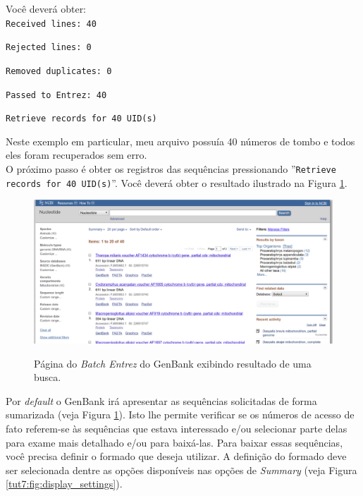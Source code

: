 \begin{refsection}
Você deverá obter:\\

\scriptsize
\noindent\texttt{Received lines: 40}

\noindent\texttt{Rejected lines: 0}

\noindent\texttt{Removed duplicates: 0}

\noindent\texttt{Passed to Entrez: 40}

\noindent\texttt{Retrieve records for 40 UID(s)}

\normalsize

Neste exemplo em particular, meu arquivo possuía 40 números de tombo e todos eles foram recuperados sem erro.\\
O próximo passo é obter os registros das sequências pressionando ''\texttt{Retrieve records for 40 UID(s)}''. Você deverá obter o resultado ilustrado na Figura \ref{tut7:fig:bacth_entrez_2}.\\

  \begin{figure}[H]
       \centering
      {\includegraphics[scale=0.3]{figures/tut7/entrez_2.eps}}
	{\caption[GenBnank \textit{Batch Entrez}: resultado de busca]{Página do \textit{Batch Entrez} do GenBank exibindo resultado de uma busca.}\label{tut7:fig:bacth_entrez_2}}
  \end{figure}


Por \textit{default} o GenBank irá apresentar as sequências solicitadas de forma sumarizada (veja Figura \ref{tut7:fig:bacth_entrez_2}). Isto lhe permite verificar se os números de acesso de fato referem-se às sequências que estava interessado e/ou selecionar parte delas para exame mais detalhado e/ou para baixá-las. Para baixar essas sequências, você precisa definir o formado que deseja utilizar. A definição do formado deve ser selecionada dentre as opções disponíveis nas opções de \textit{Summary} (veja Figura \ref{tut7:fig:display_settings}).


\end{refsection}
